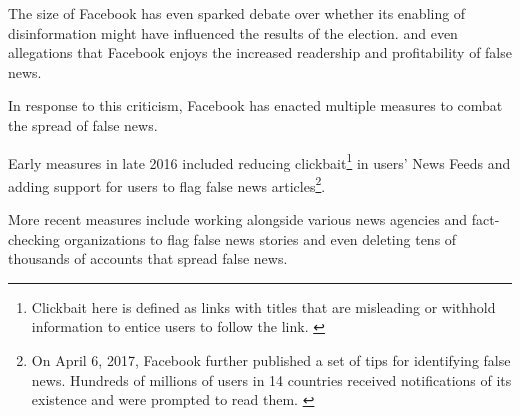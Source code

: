 \par The size of Facebook has even sparked debate over whether its enabling of disinformation might have influenced the results of the election. \cite{bbc_facebook_fake_news_crisis, wp_russian_election_propaganda} and even allegations that Facebook enjoys the increased readership and profitability of false news. \cite{tc_facebook_responsibility}

\par In response to this criticism, Facebook has enacted multiple measures to combat the spread of false news.

\par Early measures in late 2016 included reducing clickbait\footnote{Clickbait here is defined as links with titles that are misleading or withhold information to entice users to follow the link. \cite{fb_addressing_hoaxes}} in users' News Feeds \cite{fb_addressing_hoaxes} and adding support for users to flag false news articles\footnote{On April 6, 2017, Facebook further published a set of tips for identifying false news. Hundreds of millions of users in 14 countries received notifications of its existence and were prompted to read them. \cite{guardian_fb_tips}}. \cite{tc_fb_down_ranks_fake_news} 

\par More recent measures include working alongside various news agencies and fact-checking organizations to flag false news stories \cite{guardian_steps} and even deleting tens of thousands of accounts that spread false news. \cite{telegraph_fb_delete}